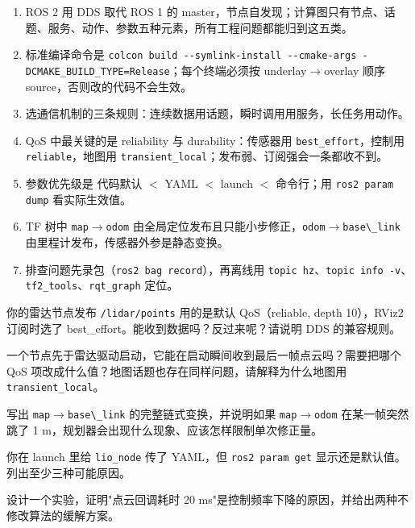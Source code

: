 \begin{summary}

\begin{enumerate}
  \item ROS 2 用 DDS 取代 ROS 1 的 master，节点自发现；计算图只有节点、话题、服务、动作、参数五种元素，所有工程问题都能归到这五类。
  \item 标准编译命令是 \lstinline{colcon build --symlink-install --cmake-args -DCMAKE_BUILD_TYPE=Release}；每个终端必须按 underlay$\to$overlay 顺序 source，否则改的代码不会生效。
  \item 选通信机制的三条规则：连续数据用话题，瞬时调用用服务，长任务用动作。
  \item QoS 中最关键的是 reliability 与 durability：传感器用 \lstinline{best_effort}，控制用 \lstinline{reliable}，地图用 \lstinline{transient_local}；发布弱、订阅强会一条都收不到。
  \item 参数优先级是 代码默认 $<$ YAML $<$ launch $<$ 命令行；用 \lstinline{ros2 param dump} 看实际生效值。
  \item TF 树中 \lstinline{map}$\to$\lstinline{odom} 由全局定位发布且只能小步修正，\lstinline{odom}$\to$\lstinline{base\_link} 由里程计发布，传感器外参是静态变换。
  \item 排查问题先录包（\lstinline{ros2 bag record}），再离线用 \lstinline{topic hz}、\lstinline{topic info -v}、\lstinline{tf2_tools}、\lstinline{rqt_graph} 定位。
\end{enumerate}


\end{summary}

\begin{problemset}

  \item 你的雷达节点发布 \lstinline{/lidar/points} 用的是默认 QoS（reliable, depth 10），RViz2 订阅时选了 best\_effort。能收到数据吗？反过来呢？请说明 DDS 的兼容规则。
  \item 一个节点先于雷达驱动启动，它能在启动瞬间收到最后一帧点云吗？需要把哪个 QoS 项改成什么值？地图话题也存在同样问题，请解释为什么地图用 \lstinline{transient_local}。
  \item 写出 \lstinline{map}$\to$\lstinline{base\_link} 的完整链式变换，并说明如果 \lstinline{map}$\to$\lstinline{odom} 在某一帧突然跳了 1 m，规划器会出现什么现象、应该怎样限制单次修正量。
  \item 你在 launch 里给 \lstinline{lio_node} 传了 YAML，但 \lstinline{ros2 param get} 显示还是默认值。列出至少三种可能原因。
  \item 设计一个实验，证明"点云回调耗时 20 ms"是控制频率下降的原因，并给出两种不修改算法的缓解方案。
\end{problemset}

